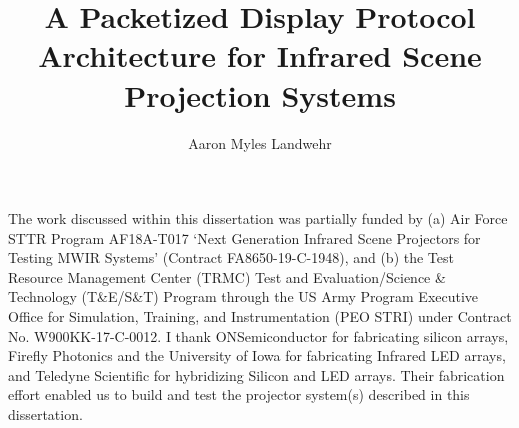 \documentclass{udthesis}
\begin{document}
    \title[A Packetized Display Protocol Architecture for Infrared Scene Projection Systems]{A Packetized Display Protocol Architecture for Infrared Scene Projection Systems}
    \author{Aaron Myles Landwehr}
    \majorfieldtrue{}
    \subject{Doctor of Philosophy in Electrical and Computer Engineering}

    \maketitlepage

    \begin{approvalpage}
    \end{approvalpage}

    \begin{signedpage} %
    \end{signedpage}

    \begin{front} %
            

            The work discussed within this dissertation was partially funded by (a) Air Force STTR Program AF18A-T017 `Next Generation Infrared Scene Projectors for Testing MWIR Systems' (Contract FA8650-19-C-1948), and (b) the Test Resource Management Center (TRMC) Test and Evaluation/Science \& Technology (T\&E/S\&T) Program through the US Army Program Executive Office for Simulation, Training, and Instrumentation (PEO STRI) under Contract No. W900KK-17-C-0012. I thank ONSemiconductor for fabricating silicon arrays, Firefly Photonics and the University of Iowa for fabricating Infrared LED arrays, and Teledyne Scientific for hybridizing Silicon and LED arrays. Their fabrication effort enabled us to build and test the projector system(s) described in this dissertation.
        \maketocloflot
            
    \end{front}
\end{document}
